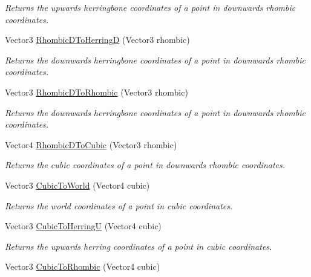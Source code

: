 \begin{DoxyCompactItemize}
\begin{DoxyCompactList}\small\item\em Returns the upwards herringbone coordinates of a point in downwards rhombic coordinates.\end{DoxyCompactList}\item 
Vector3 \hyperlink{class_g_f_hex_grid_a17af97050751d292ba61ac0629243da0_a17af97050751d292ba61ac0629243da0}{Rhombic\+D\+To\+Herring\+D} (Vector3 rhombic)
\begin{DoxyCompactList}\small\item\em Returns the downwards herringbone coordinates of a point in downwards rhombic coordinates.\end{DoxyCompactList}\item 
Vector3 \hyperlink{class_g_f_hex_grid_a92465d198faca2652e51c726acb94efe_a92465d198faca2652e51c726acb94efe}{Rhombic\+D\+To\+Rhombic} (Vector3 rhombic)
\begin{DoxyCompactList}\small\item\em Returns the downwards herringbone coordinates of a point in downwards rhombic coordinates.\end{DoxyCompactList}\item 
Vector4 \hyperlink{class_g_f_hex_grid_a5e48d303cdd36b6621c572152123183b_a5e48d303cdd36b6621c572152123183b}{Rhombic\+D\+To\+Cubic} (Vector3 rhombic)
\begin{DoxyCompactList}\small\item\em Returns the cubic coordinates of a point in downwards rhombic coordinates.\end{DoxyCompactList}\item 
Vector3 \hyperlink{class_g_f_hex_grid_a7a59e6279ccbb14fbae1a053395b14ae_a7a59e6279ccbb14fbae1a053395b14ae}{Cubic\+To\+World} (Vector4 cubic)
\begin{DoxyCompactList}\small\item\em Returns the world coordinates of a point in cubic coordinates.\end{DoxyCompactList}\item 
Vector3 \hyperlink{class_g_f_hex_grid_a72c80c9cc6baa0183cc023d069049370_a72c80c9cc6baa0183cc023d069049370}{Cubic\+To\+Herring\+U} (Vector4 cubic)
\begin{DoxyCompactList}\small\item\em Returns the upwards herring coordinates of a point in cubic coordinates.\end{DoxyCompactList}\item 
Vector3 \hyperlink{class_g_f_hex_grid_a397fa739ccb7cd8fd68c82203bc2838a_a397fa739ccb7cd8fd68c82203bc2838a}{Cubic\+To\+Rhombic} (Vector4 cubic)

\end{DoxyCompactItemize}
